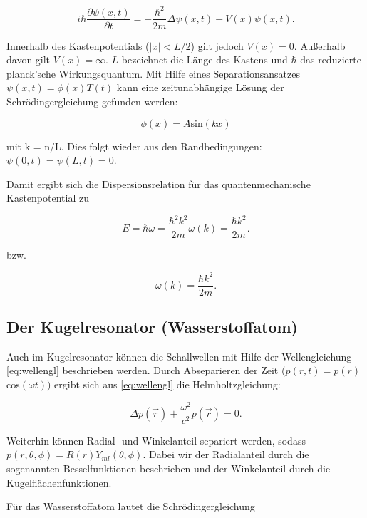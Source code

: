 \begin{equation}
  i\hbar\frac{\partial\psi(x,t)}{\partial t}=-\frac{\hbar^2}{2m}\Delta\psi(x,t) + V(x)\psi(x,t) .
\end{equation}

Innerhalb des Kastenpotentials ($|x| < L/2$) gilt jedoch $V(x) = 0$. Außerhalb davon gilt $V(x) = \infty$.
$L$ bezeichnet die Länge des Kastens und $\hbar$ das reduzierte planck'sche Wirkungsquantum. Mit Hilfe eines Separationsansatzes
$\psi(x,t) = \phi(x)T(t)$ kann eine zeitunabhängige Lösung der Schrödingergleichung gefunden werden:

\begin{equation}
  \phi(x) = A \text{sin}(kx)
\end{equation}

mit k = n\pi/L. Dies folgt wieder aus den Randbedingungen: $\psi(0,t) = \psi(L,t) = 0$.

Damit ergibt sich die Dispersionsrelation für das quantenmechanische Kastenpotential zu

\begin{equation}
  E = \hbar \omega = \frac{\hbar^2 k^2}{2m}   \omega(k) = \frac{\hbar k^2}{2m}.
\end{equation}

bzw.

\begin{equation}
  \omega(k) = \frac{\hbar k^2}{2m}.
\end{equation}

\subsection{Der Kugelresonator (Wasserstoffatom)}

Auch im Kugelresonator können die Schallwellen mit Hilfe der Wellengleichung \ref{eq:wellengl} beschrieben werden.
Durch Abseparieren der Zeit $(p(r,t) = p(r)$cos$(\omega t))$ ergibt sich aus \ref{eq:wellengl} die Helmholtzgleichung:

\begin{equation}
  \Delta p(\vec{r}) + \frac{\omega^2}{c^2}p(\vec{r}) = 0 .
\end{equation}

Weiterhin können Radial- und Winkelanteil separiert werden, sodass $p(r,\theta,\phi) = R(r) Y_{ml}(\theta,\phi)$. Dabei
wir der Radialanteil durch die sogenannten Besselfunktionen beschrieben und der Winkelanteil durch die Kugelflächenfunktionen.

Für das Wasserstoffatom lautet die Schrödingergleichung

